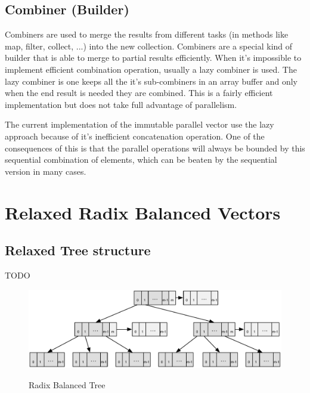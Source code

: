 \subsection{Combiner (Builder)}
Combiners are used to merge the results from different tasks (in methods like map, filter, collect, ...) into the new collection. Combiners are a special kind of builder that is able to merge to partial results efficiently. When it's impossible to implement efficient combination operation, usually a lazy combiner is used. The lazy combiner is one keeps all the it's sub-combiners in an array buffer and only when the end result is needed they are combined. This is a fairly efficient implementation but does not take full advantage of parallelism. 

The current implementation of the immutable parallel vector \cite{scalaParVector211} use the lazy approach because of it's inefficient concatenation operation. One of the consequences of this is that the parallel operations will always be bounded by this sequential combination of elements, which can be beaten by the sequential version in many cases.
 


\section{Relaxed Radix Balanced Vectors}


\subsection{Relaxed Tree structure}

\color{red} TODO \color{black}

\begin{figure}[h!]
  \centering
  \includegraphics[width=\textwidth]{Figures/Relaxed_Radix_balanced}
  \label{Relaxed_Radix_balanced}
  \caption{Radix Balanced Tree}
\end{figure}

